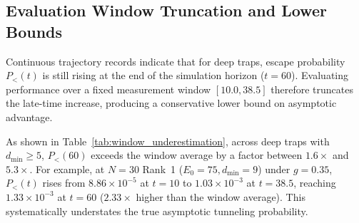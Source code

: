 \documentclass[10pt,twocolumn,a4paper]{article}
\begin{document}
\subsection{Evaluation Window Truncation and Lower Bounds}
\label{subsec:window}
Continuous trajectory records indicate that for deep traps, escape probability $P_<(t)$ is still rising at the end of the simulation horizon ($t = 60$). Evaluating performance over a fixed measurement window $[10.0, 38.5]$ therefore truncates the late-time increase, producing a conservative lower bound on asymptotic advantage.

\begin{table}[t]
\centering
\small
\caption{Comparison of window-averaged escape probability $\langle P_< \rangle_{[10, 38.5]}$ versus late-time escape probability $P_<(t = 60)$ for deep traps across $N \in \{24, 28, 30\}$.}
\label{tab:window_underestimation}
\end{table}

As shown in Table~\ref{tab:window_underestimation}, across deep traps with $d_{\min} \ge 5$, $P_<(60)$ exceeds the window average by a factor between $1.6\times$ and $5.3\times$. For example, at $N = 30$ Rank~1 ($E_0 = 75, d_{\min} = 9$) under $g = 0.35$, $P_<(t)$ rises from $8.86 \times 10^{-5}$ at $t = 10$ to $1.03 \times 10^{-3}$ at $t = 38.5$, reaching $1.33 \times 10^{-3}$ at $t = 60$ ($2.33\times$ higher than the window average). This systematically understates the true asymptotic tunneling probability.
\end{document}
